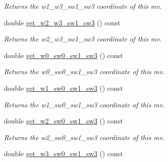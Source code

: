 \begin{DoxyCompactItemize}
\begin{DoxyCompactList}\small\item\em Returns the w1\-\_\-w3\-\_\-sw1\-\_\-sw3 coordinate of this mv. \end{DoxyCompactList}\item 
\hypertarget{classe3ga_1_1mv_ae4bdfde6c801597669eb58a4a3a7eb27}{double \hyperlink{classe3ga_1_1mv_ae4bdfde6c801597669eb58a4a3a7eb27}{get\-\_\-w2\-\_\-w3\-\_\-sw1\-\_\-sw3} () const }\label{classe3ga_1_1mv_ae4bdfde6c801597669eb58a4a3a7eb27}

\begin{DoxyCompactList}\small\item\em Returns the w2\-\_\-w3\-\_\-sw1\-\_\-sw3 coordinate of this mv. \end{DoxyCompactList}\item 
\hypertarget{classe3ga_1_1mv_a151378faa6e6842e8a26946ab97ed05a}{double \hyperlink{classe3ga_1_1mv_a151378faa6e6842e8a26946ab97ed05a}{get\-\_\-w0\-\_\-sw0\-\_\-sw1\-\_\-sw3} () const }\label{classe3ga_1_1mv_a151378faa6e6842e8a26946ab97ed05a}

\begin{DoxyCompactList}\small\item\em Returns the w0\-\_\-sw0\-\_\-sw1\-\_\-sw3 coordinate of this mv. \end{DoxyCompactList}\item 
\hypertarget{classe3ga_1_1mv_a6dceaae5cdb4a52f790432f44788c4fd}{double \hyperlink{classe3ga_1_1mv_a6dceaae5cdb4a52f790432f44788c4fd}{get\-\_\-w1\-\_\-sw0\-\_\-sw1\-\_\-sw3} () const }\label{classe3ga_1_1mv_a6dceaae5cdb4a52f790432f44788c4fd}

\begin{DoxyCompactList}\small\item\em Returns the w1\-\_\-sw0\-\_\-sw1\-\_\-sw3 coordinate of this mv. \end{DoxyCompactList}\item 
\hypertarget{classe3ga_1_1mv_add9315f6b27a52f70db7f0fbbdc21e0b}{double \hyperlink{classe3ga_1_1mv_add9315f6b27a52f70db7f0fbbdc21e0b}{get\-\_\-w2\-\_\-sw0\-\_\-sw1\-\_\-sw3} () const }\label{classe3ga_1_1mv_add9315f6b27a52f70db7f0fbbdc21e0b}

\begin{DoxyCompactList}\small\item\em Returns the w2\-\_\-sw0\-\_\-sw1\-\_\-sw3 coordinate of this mv. \end{DoxyCompactList}\item 
\hypertarget{classe3ga_1_1mv_ae94bd42a9f412a0b79b5e6e434b5ca06}{double \hyperlink{classe3ga_1_1mv_ae94bd42a9f412a0b79b5e6e434b5ca06}{get\-\_\-w3\-\_\-sw0\-\_\-sw1\-\_\-sw3} () const }\label{classe3ga_1_1mv_ae94bd42a9f412a0b79b5e6e434b5ca06}


\end{DoxyCompactItemize}
